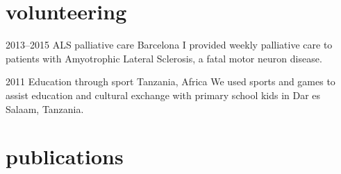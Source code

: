 \documentclass[]{friggeri-cv} %
\begin{document}

\section{volunteering}

\begin{entrylist}


\entry
{2013--2015}
{ALS palliative care}
{Barcelona}
{I provided weekly palliative care to patients with Amyotrophic
  Lateral Sclerosis, a fatal motor neuron disease.}


\entry
{2011}
{Education through sport}
{Tanzania, Africa}
{We used sports and games to assist education and cultural exchange with
  primary school kids in Dar es Salaam, Tanzania.}


\end{entrylist}


\section{publications}


\begin{refsection} 
\nocite{*}
\printbibliography[sorting=chronological, type=inproceedings,
  title={Conference papers}, heading=subbibnumbered]
\end{refsection}



\end{document}
